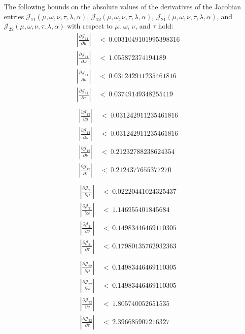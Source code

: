 \documentclass{article}
\begin{document}
\begin{lemma}
\label{proof:Bounds}
The following bounds on the absolute values of the 
derivatives of the Jacobian entries ${\mathcal J}_{11}(\mu,\omega,\nu,\tau,\lambda ,\alpha )$,
${\mathcal J}_{12}(\mu,\omega,\nu,\tau,\lambda ,\alpha )$,
${\mathcal J}_{21}(\mu,\omega,\nu,\tau,\lambda ,\alpha )$, and
${\mathcal J}_{22}(\mu,\omega,\nu,\tau,\lambda ,\alpha )$
with respect to 
$\mu$, $\omega$, $\nu$, and $\tau$ hold:
\begin{align}
\left| \frac{\partial {\mathcal J}_{11}}{\partial \mu} \right| \ &< \ 0.0031049101995398316 \\ \nonumber
\left| \frac{\partial {\mathcal J}_{11}}{\partial \omega} \right| \ &< \ 1.055872374194189 \\ \nonumber
\left| \frac{\partial {\mathcal J}_{11}}{\partial \nu} \right| \ &< \  0.031242911235461816 \\ \nonumber
\left| \frac{\partial {\mathcal J}_{11}}{\partial \tau} \right| \ &< \ 0.03749149348255419 \\ \nonumber
\end{align}
\begin{align*}
\left| \frac{\partial {\mathcal J}_{12}}{\partial \mu} \right| \ &< \ 0.031242911235461816 \\ \nonumber
\left| \frac{\partial {\mathcal J}_{12}}{\partial \omega} \right| \ &< \ 0.031242911235461816 \\ \nonumber
\left| \frac{\partial {\mathcal J}_{12}}{\partial \nu} \right| \ &< \ 0.21232788238624354 \\ \nonumber
\left| \frac{\partial {\mathcal J}_{12}}{\partial \tau} \right| \ &< \ 0.2124377655377270 \\ \nonumber
\end{align*}
\begin{align*}
\left| \frac{\partial {\mathcal J}_{21}}{\partial \mu} \right| \ &< \  0.02220441024325437 \\ \nonumber
\left| \frac{\partial {\mathcal J}_{21}}{\partial \omega} \right| \ &< \  1.146955401845684 \\ \nonumber
\left| \frac{\partial {\mathcal J}_{21}}{\partial \nu} \right| \ &< \ 0.14983446469110305 \\ \nonumber
\left| \frac{\partial {\mathcal J}_{21}}{\partial \tau} \right| \ &< \ 0.17980135762932363 \\ \nonumber
\end{align*}
\begin{align*}
\left| \frac{\partial {\mathcal J}_{22}}{\partial \mu} \right| \ &< \ 0.14983446469110305 \\ \nonumber
\left| \frac{\partial {\mathcal J}_{22}}{\partial \omega} \right| \ &< \ 0.14983446469110305 \\ \nonumber
\left| \frac{\partial {\mathcal J}_{22}}{\partial \nu} \right| \ &< \ 1.805740052651535 \\ \nonumber
\left| \frac{\partial {\mathcal J}_{22}}{\partial \tau} \right| \ &< \ 2.396685907216327
\end{align*}
\end{lemma}
\end{document}
